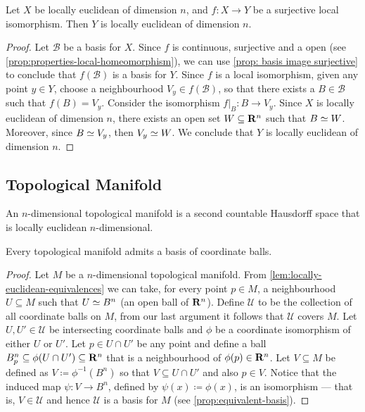 \begin{proposition}
\label{prop:locally-euclidean-from-surjective-map}
Let \(X\) be locally euclidean of dimension \(n\), and \(f: X \to Y\) be a
surjective local isomorphism. Then \(Y\) is locally euclidean of dimension
\(n\).
\end{proposition}

\begin{proof}
Let \(\mathcal B\) be a basis for \(X\). Since \(f\) is continuous, surjective
and a open (see \cref{prop:properties-local-homeomorphism}), we can use
\cref{prop: basis image surjective} to conclude that \(f(\mathcal B)\) is a
basis for \(Y\). Since \(f\) is a local isomorphism, given any point \(y \in
Y\), choose a neighbourhood \(V_y \in f(\mathcal B)\), so that there exists a
\(B \in \mathcal B\) such that \(f(B) = V_y\). Consider the isomorphism
\(f|_B: B \to V_y\). Since \(X\) is locally euclidean of dimension \(n\), there
exists an open set \(W \subseteq \mathbf{R}^n\) such that \(B \simeq W\). Moreover, since
\(B \simeq V_y\), then \(V_y \simeq W\). We conclude that \(Y\) is locally euclidean
of dimension \(n\).
\end{proof}

\subsection{Topological Manifold}

\begin{definition}\label{def: topological manifold}
An \(n\)-dimensional topological manifold is a second countable Hausdorff
space that is locally euclidean \(n\)-dimensional.
\end{definition}

\begin{proposition}\label{prop:coordinate-ball-basis}
Every topological manifold admits a basis of coordinate balls.
\end{proposition}

\begin{proof}
Let \(M\) be a \(n\)-dimensional topological manifold. From
\cref{lem:locally-euclidean-equivalences} we can take, for every point \(p \in
M\), a neighbourhood \(U \subseteq M\) such that \(U \simeq B^n\) (an open ball of
\(\mathbf{R}^n\)). Define \(\mathcal{U}\) to be the collection of all coordinate balls
on \(M\), from our last argument it follows that \(\mathcal U\) covers
\(M\). Let \(U, U' \in \mathcal U\) be intersecting coordinate balls and
\(\phi\) be a coordinate isomorphism of either \(U\) or \(U'\). Let \(p \in U
\cap U'\) be any point and define a ball \(B_{p}^{n} \subseteq \phi(U
\cap U') \subseteq \mathbf{R}^n\) that is a neighbourhood of \(\phi(p) \in \mathbf{R}^n\).
Let \(V \subseteq M\) be defined as \(V \coloneq \phi^{-1}(B^n)\) so that \(V
\subseteq U \cap U'\) and also \(p \in V\). Notice that the induced map \(\psi:
V \to B^n\), defined by \(\psi(x) \coloneq \phi(x)\), is an isomorphism --- that
is, \(V \in \mathcal U\) and hence \(\mathcal U\) is a basis for \(M\) (see
\cref{prop:equivalent-basis}).
\end{proof}

